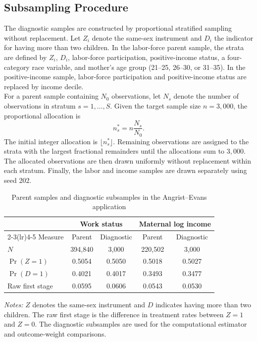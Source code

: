 \documentclass[12pt, a4paper, oneside]{article}
\theoremstyle{plain}
\theoremstyle{definition}
\begin{document}
\subsection{Subsampling Procedure}
\label{app:subsampling}

The diagnostic samples are constructed by proportional stratified sampling
without replacement. Let \(Z_i\) denote the same-sex instrument and \(D_i\)
the indicator for having more than two children. In the labor-force parent
sample, the strata are defined by \(Z_i\), \(D_i\), labor-force participation,
positive-income status, a four-category race variable, and mother's age group
(21--25, 26--30, or 31--35). In the positive-income sample, labor-force
participation and positive-income status are replaced by income decile.\\
For a parent sample containing \(N_0\) observations, let \(N_s\) denote the
number of observations in stratum \(s=1,\ldots,S\). Given the target sample
size \(n=3{,}000\), the proportional allocation is
\[
n_s^\ast=n\frac{N_s}{N_0}.
\]
The initial integer allocation is \(\lfloor n_s^\ast\rfloor\). Remaining
observations are assigned to the strata with the largest fractional remainders
until the allocations sum to \(3{,}000\). The allocated observations are then
drawn uniformly without replacement within each stratum. Finally, the labor and income samples are drawn separately using seed 202.




\begin{table}[H]
\centering
\caption{Parent samples and diagnostic subsamples in the Angrist--Evans application}
\label{tab:ae_descriptive_diagnostics}
\small
\begin{tabular}{lcccc}
\toprule
&
\multicolumn{2}{c}{Work status}
&
\multicolumn{2}{c}{Maternal log income} \\
\cmidrule(lr){2-3}\cmidrule(lr){4-5}
Measure
& Parent
& Diagnostic
& Parent
& Diagnostic \\
\midrule
\(N\)
& 394{,}840 & 3{,}000
& 220{,}502 & 3{,}000 \\

\(\Pr(Z=1)\)
& 0.5054 & 0.5050
& 0.5018 & 0.5027 \\

\(\Pr(D=1)\)
& 0.4021 & 0.4017
& 0.3493 & 0.3477 \\

Raw first stage
& 0.0595 & 0.0606
& 0.0543 & 0.0530 \\
\bottomrule
\end{tabular}

\vspace{4pt}
\begin{minipage}{0.88\textwidth}
\footnotesize
\textit{Notes:} \(Z\) denotes the same-sex instrument and \(D\) indicates
having more than two children. The raw first stage is the difference in
treatment rates between \(Z=1\) and \(Z=0\). The diagnostic subsamples are
used for the computational estimator and outcome-weight comparisons.
\end{minipage}
\end{table}
\end{document}
